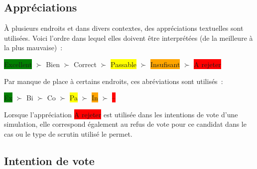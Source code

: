 \documentclass[../report]{subfiles}
\begin{document}
  \subsection{Appréciations}
  
  À plusieurs endroits et dans divers contextes, des appréciations textuelles sont utilisées. 
  Voici l'ordre dans lequel elles doivent être interprétées (de la meilleure à la plus mauvaise)~:
  
  \begin{center}
  	\colorbox{green}{Excellent} $\succ$
  	\colorbox{green!50!yellow}{Bien} $\succ$
  	\colorbox{green!25!yellow}{Correct} $\succ$
  	\colorbox{yellow}{Passable} $\succ$
  	\colorbox{orange}{Insufisant} $\succ$
  	\colorbox{red}{A rejeter}
  \end{center}

  Par manque de place à certains endroits, ces abréviations sont utilisés~:

  \begin{center}
	\colorbox{green}{Ex} $\succ$
	\colorbox{green!50!yellow}{Bi} $\succ$
	\colorbox{green!25!yellow}{Co} $\succ$
	\colorbox{yellow}{Pa} $\succ$
	\colorbox{orange}{In} $\succ$
	\colorbox{red}{--}
  \end{center}

  Lorsque l'appréciation \colorbox{red}{A rejeter} est utilisée dans les intentions de vote d'une simulation, 
  elle correspond également au refus de vote pour ce candidat dans le cas ou le type de scrutin utilisé le permet.
  
  \subsection{Intention de vote}
  
\end{document}

